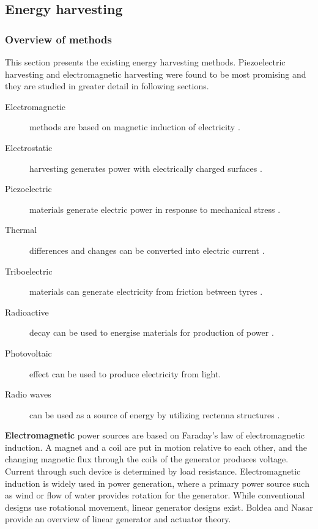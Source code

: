 \subsection{Energy harvesting}\label{sect:background}
\subsubsection{Overview of methods} \label{sect:overview}
This section presents the existing energy harvesting methods. Piezoelectric harvesting and electromagnetic harvesting were found to be most promising and they are studied in greater detail in following sections.

\begin{description}
  \item[Electromagnetic] methods are based on magnetic induction of electricity \cite{Kubba2014}.
  \item[Electrostatic] harvesting generates power with electrically charged surfaces \cite{Kubba2014}.
  \item[Piezoelectric] materials generate electric power in response to mechanical stress \cite{Kubba2014}.
  \item[Thermal] differences and changes can be converted into electric current \cite{Bowen2014}.
  \item[Triboelectric] materials can generate electricity from friction between tyres \cite{Bowen2014}.
  \item[Radioactive] decay can be used to energise materials for production of power \cite{Lal2004}.
  \item[Photovoltaic] effect can be used to produce electricity from light.
  \item[Radio waves] can be used as a source of energy by utilizing rectenna structures \cite{Patel2014}. 
\end{description}

\textbf{Electromagnetic} power sources are based on Faraday's law of electromagnetic induction. A magnet and a coil are put in motion relative to each other, and the changing magnetic flux through the coils of the generator produces voltage. Current through such device is determined by load resistance. Electromagnetic induction is widely used in power generation, where a primary power source such as wind or flow of water provides rotation for the generator. While conventional designs use rotational movement, linear generator designs exist. Boldea and Nasar \cite{Boldea1999} provide an overview of linear generator and actuator theory. 

